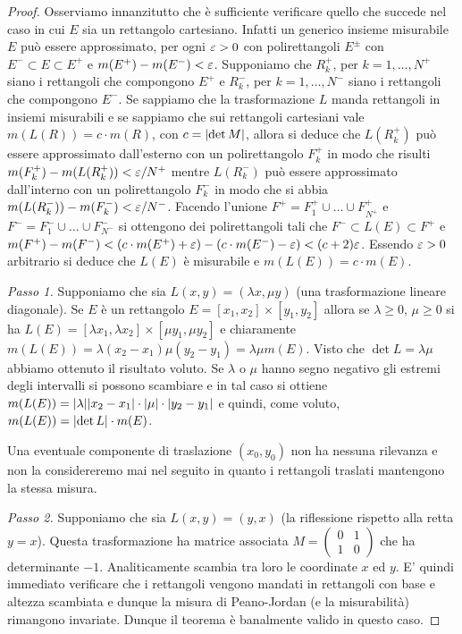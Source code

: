 \begin{proof}

Osserviamo innanzitutto che è sufficiente verificare
quello che succede nel caso in cui $E$ sia un rettangolo cartesiano.
Infatti un generico insieme misurabile $E$ può essere approssimato,
per ogni $\varepsilon>0$ con polirettangoli $E^\pm$ con $E^-\subset E \subset E^+$ 
e $m(E^+) - m(E^-) < \varepsilon$.
Supponiamo che $R^+_k$, per $k=1,\dots, N^+$ siano i rettangoli che compongono $E^+$ 
e $R^-_k$, per $k=1,\dots, N^-$ siano i rettangoli che compongono $E^-$.
Se sappiamo che la trasformazione $L$ manda rettangoli in insiemi
misurabili e se sappiamo che sui rettangoli cartesiani 
vale $m(L(R)) = c \cdot m(R)$,
con $c= {\left|\det M\right|}$, allora si deduce che $L(R_k^+)$ 
può essere approssimato dall'esterno con un polirettangolo
$F_k^+$ in modo che risulti $m(F_k^+) - m(L(R_k^+)) < \varepsilon/N^+$ 
mentre $L(R_k^-)$ può essere approssimato dall'interno con un polirettangolo 
$F_k^-$ in modo che si abbia $m(L(R_k^-))-m(F_k^-) < \varepsilon/N^-$. 
Facendo l'unione $F^+ = F_1^+ \cup \dots \cup F_{N^+}^+$
e $F^- = F_1^- \cup \dots \cup F_{N^-}^-$ si ottengono dei 
polirettangoli tali che $F^- \subset L(E)\subset F^+$ e
$m(F^+) - m(F^-) < (c\cdot  m(E^+) + \varepsilon) - (c \cdot m(E^-) -\varepsilon)
< (c+2) \varepsilon$. Essendo $\varepsilon>0$ arbitrario si deduce
che $L(E)$ è misurabile e $m(L(E)) = c\cdot  m(E)$.


\emph{Passo 1.}
Supponiamo che sia
$L(x,y) = (\lambda x,\mu y)$  (una trasformazione lineare diagonale).
Se $E$ è un rettangolo $E=[x_1,x_2]\times[y_1,y_2]$
allora se $\lambda\ge 0$, $\mu\ge 0$ si ha $L(E) = [\lambda x_1, \lambda x_2] \times [\mu y_1, \mu y_2]$
e chiaramente $m(L(E)) = \lambda (x_2-x_1) \mu (y_2-y_1) = \lambda \mu m(E)$. Visto che $\det L = \lambda \mu$ abbiamo ottenuto il risultato voluto.
Se $\lambda$ o $\mu$ hanno segno negativo
gli estremi degli intervalli si possono
scambiare e in tal caso si ottiene $m(L(E)) = {\left|\lambda\right|}{\left|x_2-x_1\right|} \cdot {\left|\mu\right|} \cdot {\left|y_2-y_1\right|}$ e quindi, come
voluto, $m(L(E))={\left|\det L\right|} \cdot m(E)$.

Una eventuale componente di traslazione $(x_0,y_0)$ non ha nessuna
rilevanza e non la considereremo mai nel seguito in quanto i rettangoli traslati mantengono la stessa misura.

\emph{Passo 2.}
Supponiamo che sia $L(x,y) = (y,x)$ (la riflessione rispetto alla retta $y=x$). 
Questa trasformazione ha matrice associata 
$M=\begin{pmatrix}0&1\\1&0\end{pmatrix}$ 
che ha determinante $-1$. 
Analiticamente scambia tra loro le coordinate $x$ ed $y$.
E' quindi immediato verificare che i rettangoli vengono mandati
in rettangoli con base e altezza scambiata e dunque la misura di
Peano-Jordan (e la misurabilità) rimangono invariate.
Dunque il teorema è banalmente valido in questo caso.


\end{proof}
